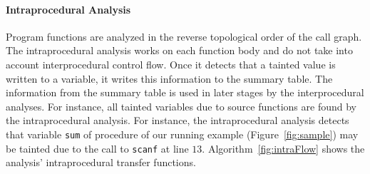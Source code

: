 \paragraph{Intraprocedural Analysis}
Program functions are analyzed in the reverse topological
order of the call graph.
The intraprocedural analysis works on each function body and
do not take into account interprocedural control flow.
Once it detects that a tainted value is written to a variable,
it writes this information to the summary table. The
information from the summary table is used in later stages
by the interprocedural analyses.
For instance, all tainted variables due to source functions
are found by the intraprocedural analysis.
For instance, the intraprocedural analysis detects that variable
\texttt{sum} of procedure \compute{} of our running example
(Figure~\ref{fig:sample}) may be tainted due to the call
to \texttt{scanf} at line $13$. Algorithm~\ref{fig:intraFlow}
shows the analysis' intraprocedural transfer functions. 
\IncMargin{1em}
